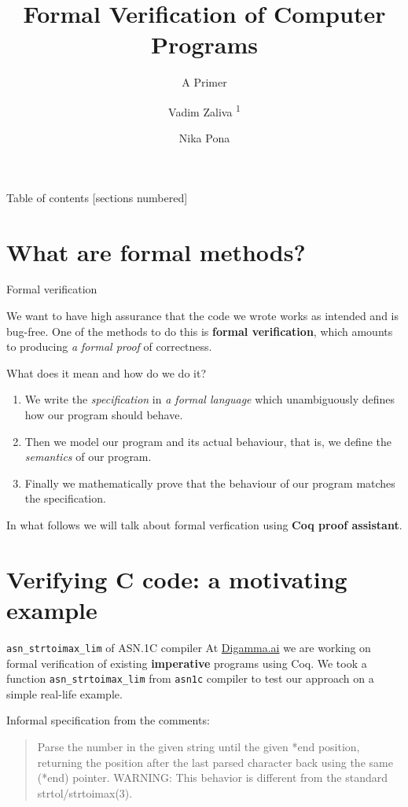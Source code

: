 \documentclass[10pt]{beamer}
\title{Formal Verification of Computer Programs}
\subtitle{A Primer}
\date{\date{}}
\author[shortname]{Vadim Zaliva \textsuperscript{1} \and Nika Pona \inst{2}}
\institute[shortinst]{\textsuperscript{1}Carnegie Mellon  University \and \inst{2} Digamma.ai}
\begin{document}
\maketitle

\begin{frame}{Table of contents}
  [sections numbered]
  \tableofcontents[hideallsubsections]
\end{frame}


\section{What are formal methods?}
\begin{frame}{Formal verification}
 
  We want to have high assurance that the code we wrote works as intended and is bug-free. One of the methods to do this is {\bf formal verification}, which amounts to producing {\it a formal proof} of correctness.

  {\center What does it mean and how do we do it?}
  
  \begin{enumerate}
  \item We write the \emph{specification} in {\it a formal language} which unambiguously defines how our program should behave.
  \item Then we model our program and its actual behaviour, that is, we define the \emph{semantics} of our program. 
  \item Finally we mathematically prove that the behaviour of our program matches the specification.
\end{enumerate}

In what follows we will talk about formal verfication using {\bf Coq proof assistant}.
  
\end{frame}

\section{Verifying C code: a motivating example}

\begin{frame}{\texttt{asn\_strtoimax\_lim} of ASN.1C compiler}
  At \url{Digamma.ai} we are working on formal verification of existing {\bf imperative} programs using Coq. We took a function \texttt{asn\_strtoimax\_lim} from \texttt{asn1c} compiler to test our approach on a simple real-life example.
  

  Informal specification from the comments: 

 \begin{quote}
 Parse the number in the given string until the given *end position,
 returning the position after the last parsed character back using the
 same (*end) pointer.
 WARNING: This behavior is different from the standard strtol/strtoimax(3).
\end{quote}
\end{frame}
\end{document}

